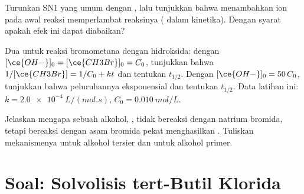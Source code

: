 \begin{exercise}[$\star\star\star$]\label{exo:b1:nucleophilic-substitution:10}
Turunkan  SN1 yang umum dengan , lalu
tunjukkan bahwa menambahkan ion   pada awal reaksi
memperlambat reaksinya ( dalam kinetika). Dengan syarat
apakah efek ini dapat diabaikan?
\end{exercise}

\begin{exercise}[$\star\star\star$]\label{exo:b1:nucleophilic-substitution:11}
Dua  untuk reaksi bromometana dengan hidroksida: dengan
$[\ce{OH-}]_0 = [\ce{CH3Br}]_0 = C_0$, tunjukkan bahwa $1/[\ce{CH3Br}] = 1/C_0 +
kt$ dan tentukan $t_{1/2}$. Dengan $[\ce{OH-}]_0 = 50\,C_0$, tunjukkan
bahwa peluruhannya eksponensial dan tentukan $t_{1/2}$. Data latihan ini:
$k =
\qty{2.0e-4}{L/(mol.s)}$, $C_0 = \qty{0.010}{mol/L}$.
\end{exercise}

\begin{exercise}[$\star\star\star$]\label{exo:b1:nucleophilic-substitution:12}
Jelaskan mengapa sebuah alkohol, , tidak bereaksi dengan natrium
bromida, tetapi bereaksi dengan asam bromida pekat menghasilkan
. Tuliskan mekanismenya untuk alkohol tersier dan untuk alkohol
primer.
\end{exercise}

\section{Soal: Solvolisis tert-Butil Klorida}

